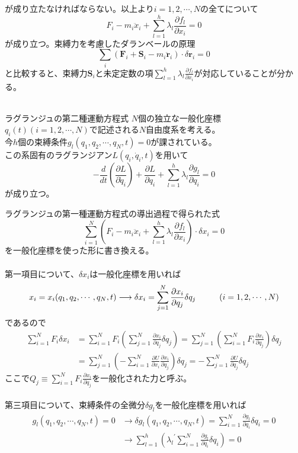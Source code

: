 \documentclass{jsarticle}
\begin{document}
が成り立たなければならない。以上より\(i=1,2,\cdots,N\)の全てについて
\[F_{i}-m_{i}\ddot{x}_{i}+\sum_{l=1}^{h}\lambda_{l}\frac{\partial f_{l}}{\partial x_{i}}=0\]
が成り立つ。束縛力を考慮したダランベールの原理
\[\sum_{i}(\bm{F}_{i}+\bm{S}_{i}-m_{i}\ddot{\bm{r}}_{i})\cdot\delta\bm{r}_{i}=0\]
と比較すると、束縛力\(\bm{S}_{i}\)と未定定数の項\(\displaystyle\sum_{l=1}^{h}\lambda_{l}\frac{\partial f_{l}}{\partial x_{i}}\)が対応していることが分かる。\\
\\
\begin{itembox}[l]{ラグランジュの第二種運動方程式}
\(N\)個の独立な一般化座標\(q_{i}(t)(i=1,2,\cdots,N)\)で記述される\(N\)自由度系を考える。\\
今\(h\)個の束縛条件\(g_{l}(q_{1},q_{2},\cdots,q_{N},t)=0\)が課されている。\\
この系固有のラグランジアン\(L(q_{i},\dot{q}_{i},t)\)を用いて
\[-\frac{d}{dt}\left(\frac{\partial L}{\partial\dot{q}_{i}}\right)+\frac{\partial L}{\partial q_{i}}+\sum_{l=1}^{h}\lambda_{l}\frac{\partial g_{l}}{\partial q_{i}}=0\]
が成り立つ。
\end{itembox}
ラグランジュの第一種運動方程式の導出過程で得られた式
\[\sum_{i=1}^{N}\left(F_{i}-m_{i}\ddot{x}_{i}+\sum_{l=1}^{h}\lambda_{l}\frac{\partial f_{l}}{\partial x_{i}}\right)\cdot\delta x_{i}=0\]
を一般化座標を使った形に書き換える。\\
\\
第一項目について、\(\delta x_{i}\)は一般化座標を用いれば
\[x_{i}=x_{i}(q_{1},q_{2},\cdots,q_{N},t)\longrightarrow\delta x_{i}=\sum_{j=1}^{N}\frac{\partial x_{i}}{\partial q_{j}}\delta q_{j}\hspace{10mm}(i=1,2,\cdots,N)\]
であるので
\begin{align*}
\sum_{i=1}^{N}F_{i}\delta x_{i}&=\sum_{i=1}^{N}F_{i}\left(\sum_{j=1}^{N}\frac{\partial x_{i}}{\partial q_{j}}\delta q_{j}\right)=\sum_{j=1}^{N}\left(\sum_{i=1}^{N}F_{i}\frac{\partial x_{i}}{\partial q_{j}}\right)\delta q_{j}\\
&=\sum_{j=1}^{N}\left(-\sum_{i=1}^{N}\frac{\partial U}{\partial x_{i}}\frac{\partial x_{i}}{\partial q_{j}}\right)\delta q_{j}=-\sum_{j=1}^{N}\frac{\partial U}{\partial q_{j}}\delta q_{j}
\end{align*}
ここで\(\displaystyle Q_{j}\equiv\sum_{i=1}^{N}F_{i}\frac{\partial x_{i}}{\partial q_{j}}\)を一般化された力と呼ぶ。\\
\\
第三項目について、束縛条件の全微分\(\delta g_{l}\)を一般化座標を用いれば
\begin{align*}
g_{l}(q_{1},q_{2},\cdots,q_{N},t)=0&\longrightarrow\delta g_{l}(q_{1},q_{2},\cdots,q_{N},t)=\sum_{i=1}^{N}\frac{\partial g_{l}}{\partial q_{i}}\delta q_{i}=0\\
&\longrightarrow\sum_{l=1}^{h}\left({\lambda_{l}}^{\prime}\sum_{i=1}^{N}\frac{\partial g_{l}}{\partial q_{i}}\delta q_{i}\right)=0
\end{align*}
\end{document}

